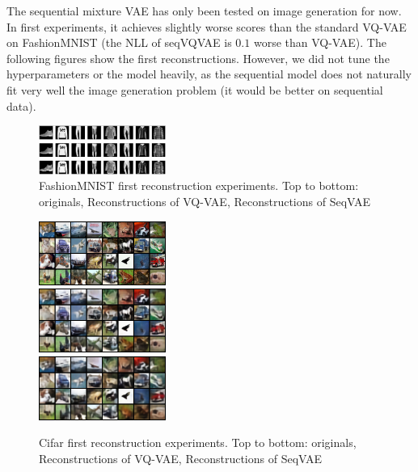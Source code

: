 \documentclass{article}
\begin{document}
The sequential mixture VAE has only been tested on image generation for now. In first experiments, it achieves slightly worse scores than the standard VQ-VAE on FashionMNIST (the NLL of seqVQVAE is $0.1$ worse than VQ-VAE). The following figures show the first reconstructions. However, we did not tune the hyperparameters or the model heavily, as the sequential model does not naturally fit very well the image generation problem (it would be better on sequential data).

\begin{figure}[htp]
    \begin{center}
    \includegraphics[width=0.37\textwidth]{images/seqvae3.png}
    \caption{FashionMNIST first reconstruction experiments. Top to bottom: originals, Reconstructions of VQ-VAE, Reconstructions of SeqVAE}
    \end{center}
\end{figure}

\begin{figure}[htp]
    \begin{center}
    \includegraphics[width=0.37\textwidth]{images/originals.png} \\
		\includegraphics[width=0.37\textwidth]{images/vqvae2.png} \\
		\includegraphics[width=0.37\textwidth]{images/seqvqvae2.png}
    \caption{Cifar first reconstruction experiments. Top to bottom: originals, Reconstructions of VQ-VAE, Reconstructions of SeqVAE}
    \end{center}
\end{figure}
\end{document}
